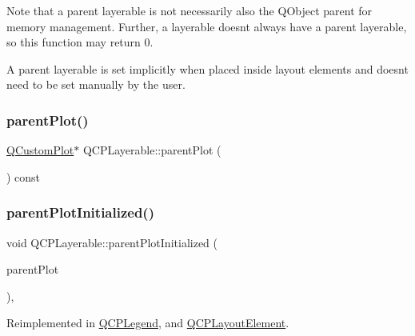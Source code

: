 Note that a parent layerable is not necessarily also the Q\+Object parent for memory management. Further, a layerable doesn\textquotesingle{}t always have a parent layerable, so this function may return 0.

A parent layerable is set implicitly when placed inside layout elements and doesn\textquotesingle{}t need to be set manually by the user. \mbox{\label{class_q_c_p_layerable_a473edb813a4c1929d6b6a8fe3ff3faf7}} 
\subsubsection{\texorpdfstring{parentPlot()}{parentPlot()}}
{\footnotesize\ttfamily \mbox{\hyperlink{class_q_custom_plot}{Q\+Custom\+Plot}}$\ast$ Q\+C\+P\+Layerable\+::parent\+Plot (\begin{DoxyParamCaption}{ }\end{DoxyParamCaption}) const\hspace{0.3cm}{\ttfamily [inline]}}

\mbox{\label{class_q_c_p_layerable_ab20b7dbd8e0249ed61adb9622c427382}} 
\subsubsection{\texorpdfstring{parentPlotInitialized()}{parentPlotInitialized()}}
{\footnotesize\ttfamily void Q\+C\+P\+Layerable\+::parent\+Plot\+Initialized (\begin{DoxyParamCaption}\item[{\mbox{\hyperlink{class_q_custom_plot}{Q\+Custom\+Plot}} $\ast$}]{parent\+Plot }\end{DoxyParamCaption})\hspace{0.3cm}{\ttfamily [protected]}, {\ttfamily [virtual]}}



Reimplemented in \mbox{\hyperlink{class_q_c_p_legend_a2b225cefb5eb267771e2c7c44fd2b408}{Q\+C\+P\+Legend}}, and \mbox{\hyperlink{class_q_c_p_layout_element_ab4bb5c5a958451f5f153fdce350f13cf}{Q\+C\+P\+Layout\+Element}}.

\mbox{\label{class_q_c_p_layerable_ab054e88f15d485defcb95e7376f119e7}} 
